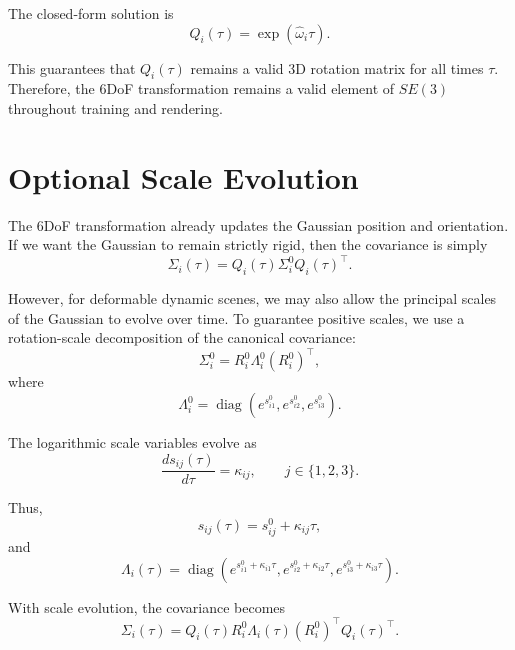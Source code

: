 \documentclass[11pt]{article}
\begin{document}
The closed-form solution is
\begin{equation}
Q_i(\tau) = \exp\left(\widehat{\omega}_i\tau\right).
\end{equation}

This guarantees that $Q_i(\tau)$ remains a valid 3D rotation matrix for all times $\tau$. Therefore, the 6DoF transformation remains a valid element of $SE(3)$ throughout training and rendering.

\section{Optional Scale Evolution}

The 6DoF transformation already updates the Gaussian position and orientation. If we want the Gaussian to remain strictly rigid, then the covariance is simply
\begin{equation}
\Sigma_i(\tau) = Q_i(\tau)\Sigma_i^0Q_i(\tau)^\top.
\end{equation}

However, for deformable dynamic scenes, we may also allow the principal scales of the Gaussian to evolve over time. To guarantee positive scales, we use a rotation-scale decomposition of the canonical covariance:
\begin{equation}
\Sigma_i^0 = R_i^0 \Lambda_i^0 (R_i^0)^\top,
\end{equation}
where
\begin{equation}
\Lambda_i^0 = \operatorname{diag} \left( e^{s_{i1}^0}, e^{s_{i2}^0}, e^{s_{i3}^0} \right).
\end{equation}

The logarithmic scale variables evolve as
\begin{equation}
\frac{d s_{ij}(\tau)}{d\tau} = \kappa_{ij},
\qquad
j\in\{1,2,3\}.
\end{equation}

Thus,
\begin{equation}
s_{ij}(\tau)=s_{ij}^0+\kappa_{ij}\tau,
\end{equation}
and
\begin{equation}
\Lambda_i(\tau) = \operatorname{diag} \left( e^{s_{i1}^0+\kappa_{i1}\tau}, e^{s_{i2}^0+\kappa_{i2}\tau}, e^{s_{i3}^0+\kappa_{i3}\tau} \right).
\end{equation}

With scale evolution, the covariance becomes
\begin{equation}
\Sigma_i(\tau) = Q_i(\tau) R_i^0 \Lambda_i(\tau) (R_i^0)^\top Q_i(\tau)^\top.
\end{equation}
\end{document}

